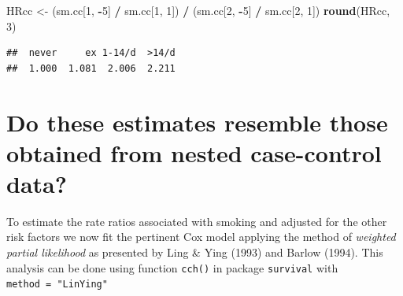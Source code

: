 \documentclass[
]{book}
\newenvironment{Shaded}{\begin{snugshade}}{\end{snugshade}}
\newcommand{\AttributeTok}[1]{\textcolor[rgb]{0.13,0.29,0.53}{#1}}
\newcommand{\ConstantTok}[1]{\textcolor[rgb]{0.56,0.35,0.01}{#1}}
\newcommand{\DecValTok}[1]{\textcolor[rgb]{0.00,0.00,0.81}{#1}}
\newcommand{\FunctionTok}[1]{\textcolor[rgb]{0.13,0.29,0.53}{\textbf{#1}}}
\newcommand{\NormalTok}[1]{#1}
\newcommand{\OtherTok}[1]{\textcolor[rgb]{0.56,0.35,0.01}{#1}}
\newcommand{\SpecialCharTok}[1]{\textcolor[rgb]{0.81,0.36,0.00}{\textbf{#1}}}
\newcommand{\StringTok}[1]{\textcolor[rgb]{0.31,0.60,0.02}{#1}}
\begin{document}
\begin{Shaded}
\begin{Highlighting}[]
\NormalTok{HRcc }\OtherTok{\textless{}{-}} 
\NormalTok{  (sm.cc[}\DecValTok{1}\NormalTok{, }\SpecialCharTok{{-}}\DecValTok{5}\NormalTok{] }\SpecialCharTok{/}\NormalTok{ sm.cc[}\DecValTok{1}\NormalTok{, }\DecValTok{1}\NormalTok{]) }\SpecialCharTok{/}\NormalTok{ (sm.cc[}\DecValTok{2}\NormalTok{, }\SpecialCharTok{{-}}\DecValTok{5}\NormalTok{] }\SpecialCharTok{/}\NormalTok{ sm.cc[}\DecValTok{2}\NormalTok{, }\DecValTok{1}\NormalTok{])}
\FunctionTok{round}\NormalTok{(HRcc, }\DecValTok{3}\NormalTok{)}
\end{Highlighting}
\end{Shaded}

\begin{verbatim}
##  never     ex 1-14/d  >14/d 
##  1.000  1.081  2.006  2.211
\end{verbatim}

\section{Do these estimates resemble those obtained from nested case-control data?}\label{do-these-estimates-resemble-those-obtained-from-nested-case-control-data}

To estimate the rate ratios associated with smoking and adjusted for the
other risk factors we now fit the pertinent Cox model
applying the method of \emph{weighted partial likelihood} as
presented by Ling \& Ying (1993) and Barlow (1994).
This analysis can be done using function \texttt{cch()}
in package \texttt{survival} with \texttt{method\ =\ "LinYing"}

\begin{Shaded}
\end{Shaded}
\end{document}
